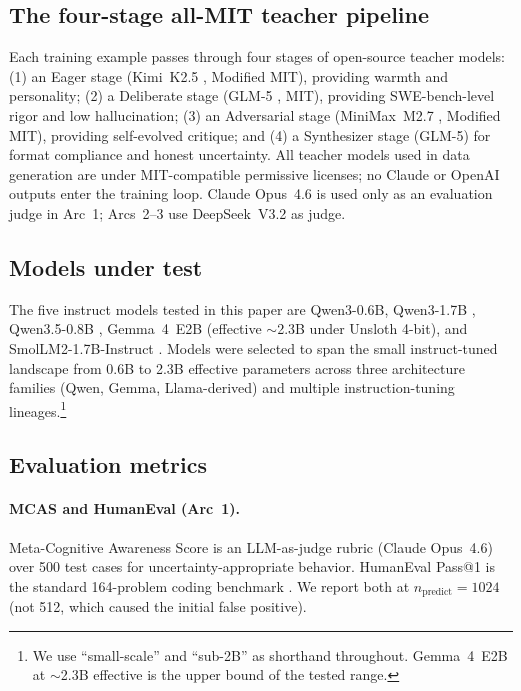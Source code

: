\documentclass[11pt,a4paper]{article}
\begin{document}
\subsection{The four-stage all-MIT teacher pipeline}

Each training example passes through four stages of open-source teacher models: (1) an Eager stage (Kimi~K2.5 \cite{kimi2025k2}, Modified MIT), providing warmth and personality; (2) a Deliberate stage (GLM-5 \cite{glm2024chatglm}, MIT), providing SWE-bench-level rigor and low hallucination; (3) an Adversarial stage (MiniMax~M2.7 \cite{minimax2025}, Modified MIT), providing self-evolved critique; and (4) a Synthesizer stage (GLM-5) for format compliance and honest uncertainty. All teacher models used in data generation are under MIT-compatible permissive licenses; no Claude or OpenAI outputs enter the training loop. Claude Opus~4.6 is used only as an evaluation judge in Arc~1; Arcs~2--3 use DeepSeek~V3.2 \cite{deepseek2024v3} as judge.

\subsection{Models under test}

The five instruct models tested in this paper are Qwen3-0.6B, Qwen3-1.7B \cite{qwen2025qwen3}, Qwen3.5-0.8B \cite{qwen2025qwen35}, Gemma~4~E2B \cite{gemma2025gemma4} (effective $\sim$2.3B under Unsloth 4-bit), and SmolLM2-1.7B-Instruct \cite{allal2024smollm}. Models were selected to span the small instruct-tuned landscape from 0.6B to 2.3B effective parameters across three architecture families (Qwen, Gemma, Llama-derived) and multiple instruction-tuning lineages.\footnote{We use ``small-scale'' and ``sub-2B'' as shorthand throughout. Gemma~4~E2B at $\sim$2.3B effective is the upper bound of the tested range.}

\subsection{Evaluation metrics}

\paragraph{MCAS and HumanEval (Arc~1).} Meta-Cognitive Awareness Score is an LLM-as-judge rubric (Claude Opus~4.6) over 500 test cases for uncertainty-appropriate behavior. HumanEval Pass@1 is the standard 164-problem coding benchmark \cite{chen2021humaneval}. We report both at $n_{\text{predict}}{=}1024$ (not 512, which caused the initial false positive).
\end{document}
